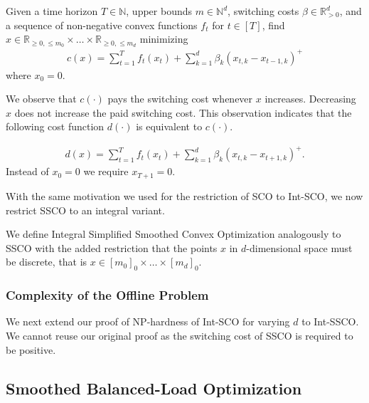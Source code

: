 \begin{problem}
Given a time horizon $T \in \mathbb{N}$, upper bounds $m \in \mathbb{N}^d$, switching costs $\beta \in \mathbb{R}_{>0}^d$, and a sequence of non-negative convex functions $f_t$ for $t \in [T]$, find $x \in \mathbb{R}_{\geq 0, \leq m_0} \times \dots \times \mathbb{R}_{\geq 0, \leq m_d}$ minimizing \begin{align*}
    c(x) = \sum_{t=1}^T f_t(x_t) + \sum_{k=1}^d \beta_k (x_{t,k} - x_{t-1,k})^+
\end{align*}
where $x_0 = 0$.
\end{problem}

We observe that $c(\cdot)$ pays the switching cost whenever $x$ increases. Decreasing $x$ does not increase the paid switching cost. This observation indicates that the following cost function $d(\cdot)$ is equivalent to $c(\cdot)$.

\begin{definition}
\begin{align*}
    d(x) = \sum_{t=1}^T f_t(x_t) + \sum_{k=1}^d \beta_k (x_{t,k} - x_{t+1,k})^+.
\end{align*}
Instead of $x_0 = 0$ we require $x_{T+1} = 0$.
\end{definition}

With the same motivation we used for the restriction of SCO to Int-SCO, we now restrict SSCO to an integral variant.

\begin{problem}
We define Integral Simplified Smoothed Convex Optimization analogously to SSCO with the added restriction that the points $x$ in $d$-dimensional space must be discrete, that is $x \in [m_0]_0 \times \dots \times [m_d]_0$.
\end{problem}

\subsubsection{Complexity of the Offline Problem}

We next extend our proof of NP-hardness of Int-SCO for varying $d$ to Int-SSCO. We cannot reuse our original proof as the switching cost of SSCO is required to be positive.

\subsection{Smoothed Balanced-Load Optimization}
\label{section:theory:smoothed_balanced_load_optimization}

